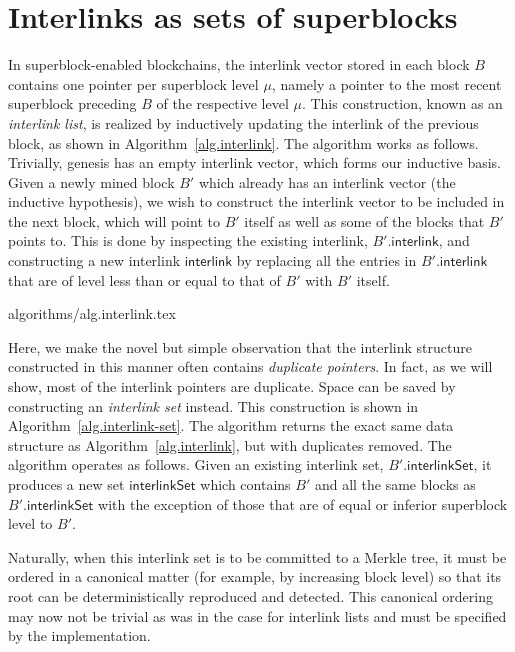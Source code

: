 \section{Interlinks as sets of superblocks}\label{sec.construction}

In superblock-enabled blockchains, the interlink vector stored in each block $B$
contains one pointer per superblock level $\mu$, namely a pointer to the most
recent superblock preceding $B$ of the respective level $\mu$. This
construction, known as an \emph{interlink list}, is realized by inductively
updating the interlink of the previous block, as shown in
Algorithm~\ref{alg.interlink}. The algorithm works as follows. Trivially,
genesis has an empty interlink vector, which forms our inductive basis. Given a
newly mined block $B'$ which already has an interlink vector (the inductive
hypothesis), we wish to construct the interlink vector to be included in the
next block, which will point to $B'$ itself as well as some of the blocks that
$B'$ points to. This is done by inspecting the existing interlink,
$B'.\textsf{interlink}$, and constructing a new interlink $\textsf{interlink}$
by replacing all the entries in $B'.\textsf{interlink}$ that are of level less
than or equal to that of $B'$ with $B'$ itself.

{algorithms/alg.interlink.tex}

Here, we make the novel but simple observation that the interlink structure
constructed in this manner often contains \emph{duplicate pointers}. In fact, as
we will show, most of the interlink pointers are duplicate. Space can be saved
by constructing an \emph{interlink set} instead. This construction is shown in
Algorithm~\ref{alg.interlink-set}. The algorithm returns the exact same data
structure as Algorithm~\ref{alg.interlink}, but with duplicates removed. The
algorithm operates as follows. Given an existing interlink set,
$B'.\textsf{interlinkSet}$, it produces a new set $\textsf{interlinkSet}$ which
contains $B'$ and all the same blocks as $B'.\textsf{interlinkSet}$ with the
exception of those that are of equal or inferior superblock level to $B'$.

Naturally, when this interlink set is to be committed to a Merkle tree, it must
be ordered in a canonical matter (for example, by increasing block level) so
that its root can be deterministically reproduced and detected. This canonical
ordering may now not be trivial as was in the case for interlink lists and must
be specified by the implementation.

